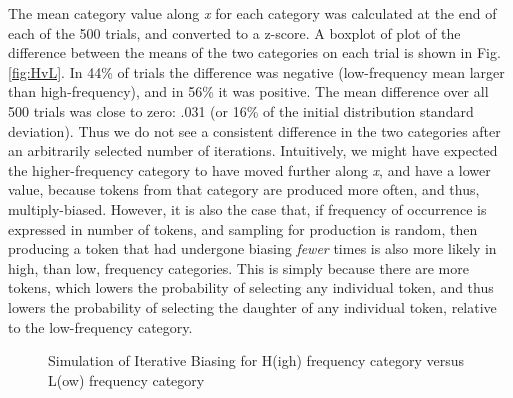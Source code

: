 The mean category value along \emph{x} for each category was calculated
at the end of each of the 500 trials, and converted to a z-score.
A boxplot of plot of the difference between the means of the two categories
on each trial is shown in Fig. \ref{fig:HvL}. In 44\% of trials the
difference was negative (low-frequency mean larger than high-frequency),
and in 56\% it was positive. The mean difference over all 500 trials
was close to zero: .031 (or 16\% of the initial distribution standard
deviation). Thus we do not see a consistent difference in the two
categories after an arbitrarily selected number of iterations. Intuitively,
we might have expected the higher-frequency category to have moved
further along \emph{x}, and have a lower value, because tokens from
that category are produced more often, and thus, multiply-biased.
However, it is also the case that, if frequency of occurrence is expressed
in number of tokens, and sampling for production is random, then producing
a token that had undergone biasing \emph{fewer} times is also more
likely in high, than low, frequency categories. This is simply because
there are more tokens, which lowers the probability of selecting any
individual token, and thus lowers the probability of selecting the
daughter of any individual token, relative to the low-frequency category. 

\begin{figure}[H]
\centering{}\hfill{}\caption{Simulation of Iterative Biasing for H(igh) frequency category versus
L(ow) frequency category}
\end{figure}

